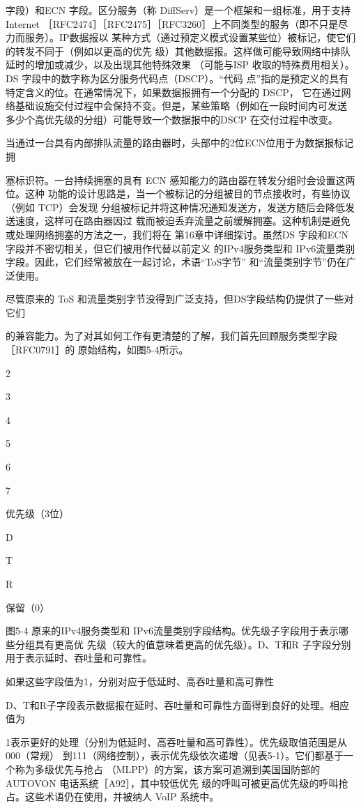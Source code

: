 字段）和ECN 字段。区分服务（称 DiffServ）是一个框架和一组标准，用于支持 Internet
［RFC2474］［RFC2475］［RFC3260］上不同类型的服务（即不只是尽力而服务）。IP数据报以
某种方式（通过预定义模式设置某些位）被标记，使它们的转发不同于（例如以更高的优先
级）其他数据报。这样做可能导致网络中排队延时的增加或减少，以及出现其他特殊效果
（可能与ISP 收取的特殊费用相关）。DS 字段中的数字称为区分服务代码点（DSCP）。“代码
点”指的是预定义的具有特定含义的位。在通常情况下，如果数据报拥有一个分配的 DSCP，
它在通过网络基础设施交付过程中会保持不变。但是，某些策略（例如在一段时间内可发送
多少个高优先级的分组）可能导致一个数据报中的DSCP 在交付过程中改变。

当通过一台具有内部排队流量的路由器时，头部中的2位ECN位用于为数据报标记拥

塞标识符。一台持续拥塞的具有 ECN 感知能力的路由器在转发分组时会设置这两位。这种
功能的设计思路是，当一个被标记的分组被目的节点接收时，有些协议（例如 TCP）会发现
分组被标记并将这种情况通知发送方，发送方随后会降低发送速度，这样可在路由器因过
载而被迫丢弃流量之前缓解拥塞。这种机制是避免或处理网络拥塞的方法之一，我们将在
第16章中详细探讨。虽然DS 字段和ECN 字段并不密切相关，但它们被用作代替以前定义
的IPv4服务类型和 IPv6流量类别字段。因此，它们经常被放在一起讨论，术语“ToS字节”
和“流量类别字节”仍在广泛使用。

尽管原来的 ToS 和流量类别字节没得到广泛支持，但DS字段结构仍提供了一些对它们

的兼容能力。为了对其如何工作有更清楚的了解，我们首先回顾服务类型字段［RFC0791］的
原始结构，如图5-4所示。

2

3

4

5

6

7

优先级（3位）

D

T

R

保留（0）

图5-4 原来的IPv4服务类型和 IPv6流量类别字段结构。优先级子字段用于表示哪些分组具有更高优
先级（较大的值意味着更高的优先级）。D、T和R 子字段分别用于表示延时、吞吐量和可靠性。

如果这些字段值为1，分别对应于低延时、高吞吐量和高可靠性

D、T和R子字段表示数据报在延时、吞吐量和可靠性方面得到良好的处理。相应值为

1表示更好的处理（分别为低延时、高吞吐量和高可靠性）。优先级取值范围是从000（常规）
到111（网络控制），表示优先级依次递增（见表5-1）。它们都基于一个称为多级优先与抢占
（MLPP）的方案，该方案可追溯到美国国防部的AUTOVON 电话系统［A92］，其中较低优先
级的呼叫可被更高优先级的呼叫抢占。这些术语仍在使用，并被纳人 VoIP 系统中。

